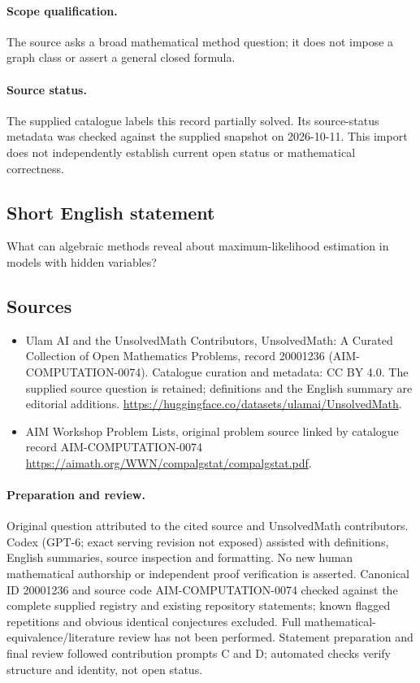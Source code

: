 \documentclass[11pt]{article}
\begin{document}
\paragraph{Scope qualification.}
The source asks a broad mathematical method question; it does not impose a graph class or assert a general closed formula.
\paragraph{Source status.}
The supplied catalogue labels this record partially solved. Its source-status metadata was checked against the supplied snapshot on 2026-10-11. This import does not independently establish current open status or mathematical correctness.
\subsection{Short English statement}
What can algebraic methods reveal about maximum-likelihood estimation in models with hidden variables?
\subsection{Sources}
\begin{itemize}
\item[S1] Ulam AI and the UnsolvedMath Contributors, UnsolvedMath: A Curated Collection of Open Mathematics Problems, record 20001236 (AIM-COMPUTATION-0074). Catalogue curation and metadata: CC BY 4.0. The supplied source question is retained; definitions and the English summary are editorial additions.
\url{https://huggingface.co/datasets/ulamai/UnsolvedMath}.
\item[S2] AIM Workshop Problem Lists, original problem source linked by catalogue record AIM-COMPUTATION-0074
\url{https://aimath.org/WWN/compalgstat/compalgstat.pdf}.
\end{itemize}
\paragraph{Preparation and review.}
Original question attributed to the cited source and UnsolvedMath contributors. Codex (GPT-6; exact serving revision not exposed) assisted with definitions, English summaries, source inspection and formatting. No new human mathematical authorship or independent proof verification is asserted. Canonical ID 20001236 and source code AIM-COMPUTATION-0074 checked against the complete supplied registry and existing repository statements; known flagged repetitions and obvious identical conjectures excluded. Full mathematical-equivalence/literature review has not been performed. Statement preparation and final review followed contribution prompts C and D; automated checks verify structure and identity, not open status.
\label{end:20001236}
\end{document}
